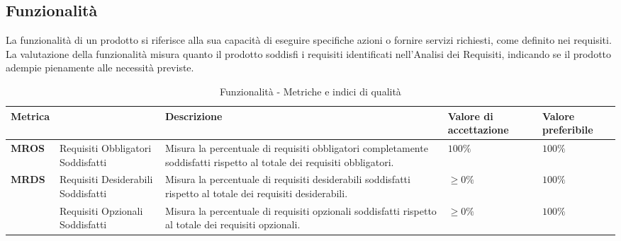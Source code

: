 \subsection{Funzionalità}
La funzionalità di un prodotto si riferisce alla sua capacità di eseguire specifiche azioni o fornire servizi richiesti, come definito nei requisiti. La valutazione della funzionalità misura quanto il prodotto soddisfi i requisiti identificati nell'Analisi dei Requisiti, indicando se il prodotto adempie pienamente alle necessità previste.  
\begin{table}[H]
    \centering
    \begin{tabular}{|C{1.5cm}|L{3cm}|L{4cm}|L{2.5cm}|L{2.5cm}|}
        \hline
        \textbf{Metrica} &  & \textbf{Descrizione} & \textbf{Valore di accettazione} & \textbf{Valore preferibile} \\
        \hline
        \textbf{MROS} & Requisiti Obbligatori Soddisfatti & Misura la percentuale di requisiti obbligatori completamente soddisfatti rispetto al totale dei requisiti obbligatori. & $100\%$ & $100\%$ \\
        \hline
        \textbf{MRDS} & Requisiti Desiderabili Soddisfatti & Misura la percentuale di requisiti desiderabili soddisfatti rispetto al totale dei requisiti desiderabili. & $\geq 0\%$ & $ 100\%$ \\
        \hline
        \textbf{} & Requisiti Opzionali Soddisfatti & Misura la percentuale di requisiti opzionali soddisfatti rispetto al totale dei requisiti opzionali. & $\geq 0\%$ & $ 100\%$ \\
        \hline
    \end{tabular}
    \caption{Funzionalità - Metriche e indici di qualità}
    \label{tab:funzionalità_qualita_prodotto}
\end{table}

